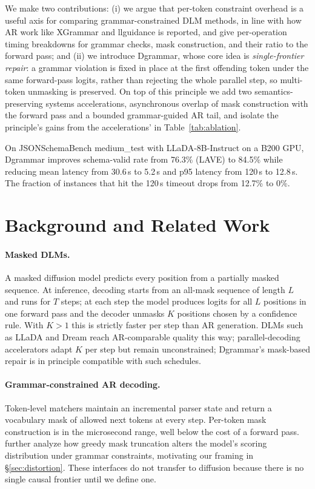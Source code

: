 \documentclass[11pt]{article}
\begin{document}
We make two contributions: (i) we argue that per-token constraint overhead is a useful axis for comparing grammar-constrained DLM methods, in line with how AR work like XGrammar \citep{xgrammar2024} and llguidance \citep{llguidance} is reported, and give per-operation timing breakdowns for grammar checks, mask construction, and their ratio to the forward pass; and (ii) we introduce Dgrammar, whose core idea is \emph{single-frontier repair}: a grammar violation is fixed in place at the first offending token under the same forward-pass logits, rather than rejecting the whole parallel step, so multi-token unmasking is preserved. On top of this principle we add two semantics-preserving systems accelerations, asynchronous overlap of mask construction with the forward pass and a bounded grammar-guided AR tail, and isolate the principle's gains from the accelerations' in Table~\ref{tab:ablation}.

On JSONSchemaBench medium\_test \citep{jsonschemabench2025} with LLaDA-8B-Instruct on a B200 GPU, Dgrammar improves schema-valid rate from 76.3\% (LAVE) to 84.5\% while reducing mean latency from 30.6\,s to 5.2\,s and p95 latency from 120\,s to 12.8\,s. The fraction of instances that hit the 120\,s timeout drops from 12.7\% to 0\%.

\section{Background and Related Work}
\label{sec:related}

\paragraph{Masked DLMs.} A masked diffusion model predicts every position from a partially masked sequence. At inference, decoding starts from an all-mask sequence of length $L$ and runs for $T$ steps; at each step the model produces logits for all $L$ positions in one forward pass and the decoder unmasks $K$ positions chosen by a confidence rule. With $K>1$ this is strictly faster per step than AR generation. DLMs such as LLaDA \citep{llada2025} and Dream \citep{dream2025} reach AR-comparable quality this way; parallel-decoding accelerators \citep{fastdllm2025,dmax2025,chen2025dparallel} adapt $K$ per step but remain unconstrained; Dgrammar's mask-based repair is in principle compatible with such schedules.

\paragraph{Grammar-constrained AR decoding.} Token-level matchers \citep{willard2023outlines,xgrammar2024,llguidance,geng2023gcd,park2025efgcd} maintain an incremental parser state and return a vocabulary mask of allowed next tokens at every step. Per-token mask construction is in the microsecond range, well below the cost of a forward pass. \citet{park2024gad} further analyze how greedy mask truncation alters the model's scoring distribution under grammar constraints, motivating our framing in \S\ref{sec:distortion}. These interfaces do not transfer to diffusion because there is no single causal frontier until we define one.
\end{document}
